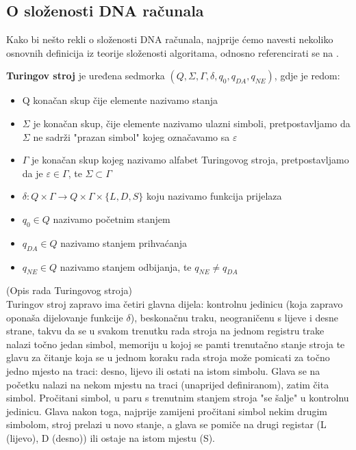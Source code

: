 \documentclass[12pt, a4paper]{book}
\begin{document}
\begin{spacing}{1.5}
\section{O složenosti DNA računala}
Kako bi nešto rekli o složenosti DNA računala, najprije ćemo navesti nekoliko osnovnih definicija iz teorije složenosti algoritama, odnosno referencirati se na \cite{Sipser}.
\begin{defn}
\textbf{Turingov stroj} je uređena sedmorka $(Q, \Sigma , \Gamma , \delta, q_0, q_{DA}, q_{NE})$, gdje je redom:
\begin{itemize}
	\item Q konačan skup čije elemente nazivamo stanja
	\item $\Sigma$ je konačan skup, čije elemente nazivamo ulazni simboli, pretpostavljamo da $\Sigma$ ne sadrži "prazan simbol" kojeg označavamo sa $\varepsilon$
	\item $\Gamma$ je konačan skup kojeg nazivamo alfabet Turingovog stroja, pretpostavljamo da je $\varepsilon \in \Gamma$, te $\Sigma \subset \Gamma$
	\item $\delta : Q \times \Gamma \to Q \times \Gamma \times \{ L,D,S\}$ koju nazivamo funkcija prijelaza
	\item $q_0 \in Q$ nazivamo početnim stanjem
	\item  $q_{DA} \in Q$ nazivamo stanjem prihvaćanja
	\item $q_{NE} \in Q$ nazivamo stanjem odbijanja, te $q_{NE}\neq q_{DA}$
\end{itemize}
\end{defn}
\begin{nap} (Opis rada Turingovog stroja)\\
Turingov stroj zapravo ima četiri glavna dijela: kontrolnu jedinicu (koja zapravo oponaša dijelovanje funkcije $\delta$), beskonačnu traku, neograničenu s lijeve i desne strane, takvu da se u svakom trenutku rada stroja na jednom registru trake nalazi točno jedan simbol, memoriju u kojoj se pamti trenutačno stanje stroja te glavu za čitanje koja se u jednom koraku rada stroja može pomicati za točno jedno mjesto na traci: desno, lijevo ili ostati na istom simbolu. Glava se na početku nalazi na nekom mjestu na traci (unaprijed definiranom), zatim čita simbol. Pročitani simbol, u paru s trenutnim stanjem stroja "se šalje" u kontrolnu jedinicu. Glava nakon toga, najprije zamijeni pročitani simbol nekim drugim simbolom, stroj prelazi u novo stanje, a glava se pomiče na drugi registar (L (lijevo), D (desno)) ili ostaje na istom mjestu (S). \\

\end{nap}
\end{spacing}
\end{document}
